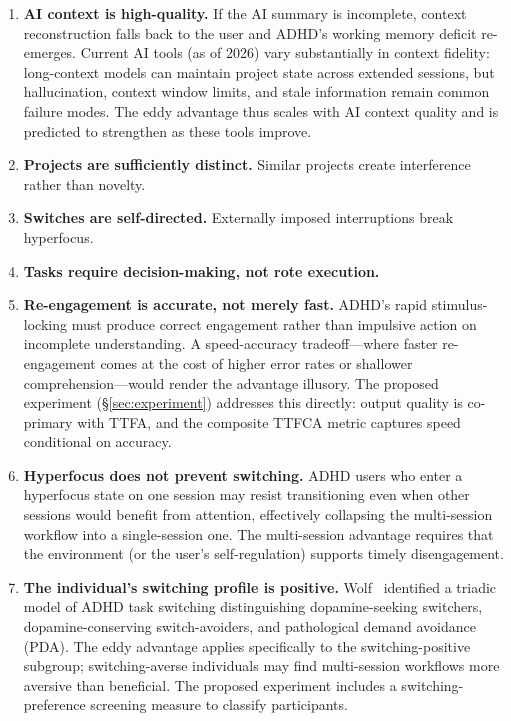 \documentclass[sigconf,nonacm]{acmart}
\begin{document}
\begin{enumerate}
\item \textbf{AI context is high-quality.} If the AI summary is incomplete, context reconstruction falls back to the user and ADHD's working memory deficit re-emerges. Current AI tools (as of 2026) vary substantially in context fidelity: long-context models can maintain project state across extended sessions, but hallucination, context window limits, and stale information remain common failure modes. The eddy advantage thus scales with AI context quality and is predicted to strengthen as these tools improve.

\item \textbf{Projects are sufficiently distinct.} Similar projects create interference rather than novelty.

\item \textbf{Switches are self-directed.} Externally imposed interruptions break hyperfocus.

\item \textbf{Tasks require decision-making, not rote execution.}

\item \textbf{Re-engagement is accurate, not merely fast.} ADHD's rapid stimulus-locking must produce correct engagement rather than impulsive action on incomplete understanding. A speed-accuracy tradeoff---where faster re-engagement comes at the cost of higher error rates or shallower comprehension---would render the advantage illusory. The proposed experiment (\S\ref{sec:experiment}) addresses this directly: output quality is co-primary with TTFA, and the composite TTFCA metric captures speed conditional on accuracy.

\item \textbf{Hyperfocus does not prevent switching.} ADHD users who enter a hyperfocus state on one session may resist transitioning even when other sessions would benefit from attention, effectively collapsing the multi-session workflow into a single-session one. The multi-session advantage requires that the environment (or the user's self-regulation) supports timely disengagement.

\item \textbf{The individual's switching profile is positive.} Wolf~\cite{wolf2025} identified a triadic model of ADHD task switching distinguishing dopamine-seeking switchers, dopamine-conserving switch-avoiders, and pathological demand avoidance (PDA). The eddy advantage applies specifically to the switching-positive subgroup; switching-averse individuals may find multi-session workflows more aversive than beneficial. The proposed experiment includes a switching-preference screening measure to classify participants.


\end{enumerate}
\end{document}
